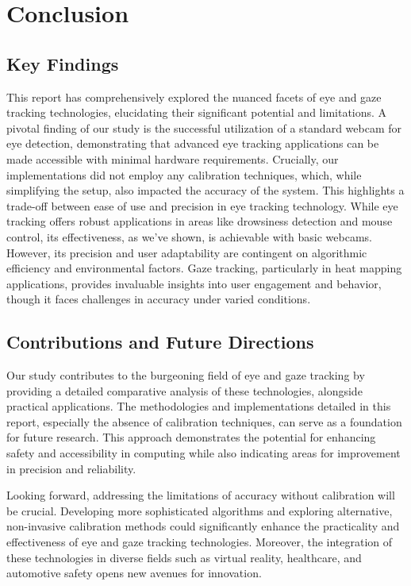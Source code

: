 \documentclass[letterpaper, 10 pt, conference]{ieeeconf}  %
\begin{document}
\section{Conclusion}

\subsection{Key Findings}
This report has comprehensively explored the nuanced facets of eye and gaze tracking technologies, elucidating their significant potential and limitations. A pivotal finding of our study is the successful utilization of a standard webcam for eye detection, demonstrating that advanced eye tracking applications can be made accessible with minimal hardware requirements. Crucially, our implementations did not employ any calibration techniques, which, while simplifying the setup, also impacted the accuracy of the system. This highlights a trade-off between ease of use and precision in eye tracking technology. While eye tracking offers robust applications in areas like drowsiness detection and mouse control, its effectiveness, as we've shown, is achievable with basic webcams. However, its precision and user adaptability are contingent on algorithmic efficiency and environmental factors. Gaze tracking, particularly in heat mapping applications, provides invaluable insights into user engagement and behavior, though it faces challenges in accuracy under varied conditions.

\subsection{Contributions and Future Directions}
Our study contributes to the burgeoning field of eye and gaze tracking by providing a detailed comparative analysis of these technologies, alongside practical applications. The methodologies and implementations detailed in this report, especially the absence of calibration techniques, can serve as a foundation for future research. This approach demonstrates the potential for enhancing safety and accessibility in computing while also indicating areas for improvement in precision and reliability.

Looking forward, addressing the limitations of accuracy without calibration will be crucial. Developing more sophisticated algorithms and exploring alternative, non-invasive calibration methods could significantly enhance the practicality and effectiveness of eye and gaze tracking technologies. Moreover, the integration of these technologies in diverse fields such as virtual reality, healthcare, and automotive safety opens new avenues for innovation.
\end{document}

